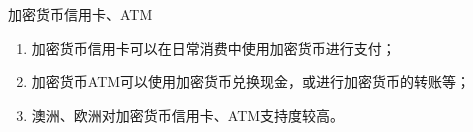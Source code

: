 \documentclass[11pt]{beamer}
\begin{document}
\begin{frame}{加密货币信用卡、ATM}
	
	\begin{minipage}[t]{0.5\linewidth}
		\centering
		\begin{enumerate}
			\item 加密货币信用卡可以在日常消费中使用加密货币进行支付；
			\item 加密货币ATM可以使用加密货币兑换现金，或进行加密货币的转账等；
			\item 澳洲、欧洲对加密货币信用卡、ATM支持度较高。
		\end{enumerate}
	
	\end{minipage}%
	\begin{minipage}[t]{0.4\linewidth}
		\begin{figure}
			\centering
		\end{figure}
	\end{minipage}%
\end{frame}
\end{document}
